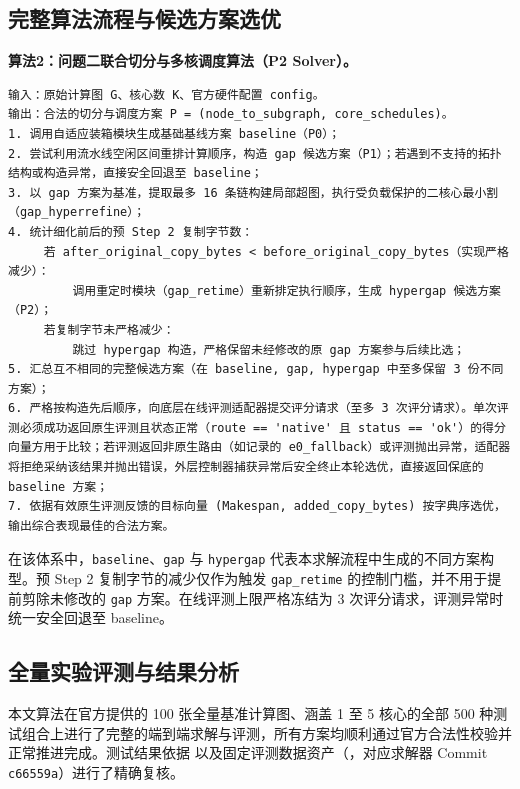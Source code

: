 \documentclass[anonymous,notoc]{gmcm2026}
\begin{document}
\subsection{完整算法流程与候选方案选优}

\textbf{算法2：问题二联合切分与多核调度算法（P2 Solver）。}

\begin{lstlisting}[style=gmcmappendix,language={}]
输入：原始计算图 G、核心数 K、官方硬件配置 config。
输出：合法的切分与调度方案 P = (node_to_subgraph, core_schedules)。
1. 调用自适应装箱模块生成基础基线方案 baseline（P0）；
2. 尝试利用流水线空闲区间重排计算顺序，构造 gap 候选方案（P1）；若遇到不支持的拓扑结构或构造异常，直接安全回退至 baseline；
3. 以 gap 方案为基准，提取最多 16 条链构建局部超图，执行受负载保护的二核心最小割（gap_hyperrefine）；
4. 统计细化前后的预 Step 2 复制字节数：
     若 after_original_copy_bytes < before_original_copy_bytes（实现严格减少）：
         调用重定时模块（gap_retime）重新排定执行顺序，生成 hypergap 候选方案（P2）；
     若复制字节未严格减少：
         跳过 hypergap 构造，严格保留未经修改的原 gap 方案参与后续比选；
5. 汇总互不相同的完整候选方案（在 baseline, gap, hypergap 中至多保留 3 份不同方案）；
6. 严格按构造先后顺序，向底层在线评测适配器提交评分请求（至多 3 次评分请求）。单次评测必须成功返回原生评测且状态正常（route == 'native' 且 status == 'ok'）的得分向量方用于比较；若评测返回非原生路由（如记录的 e0_fallback）或评测抛出异常，适配器将拒绝采纳该结果并抛出错误，外层控制器捕获异常后安全终止本轮选优，直接返回保底的 baseline 方案；
7. 依据有效原生评测反馈的目标向量 (Makespan, added_copy_bytes) 按字典序选优，输出综合表现最佳的合法方案。
\end{lstlisting}

在该体系中，\texttt{baseline}、\texttt{gap} 与 \texttt{hypergap} 代表本求解流程中生成的不同方案构型。预 Step 2 复制字节的减少仅作为触发 \texttt{gap\_retime} 的控制门槛，并不用于提前剪除未修改的 \texttt{gap} 方案。在线评测上限严格冻结为 3 次评分请求，评测异常时统一安全回退至 baseline。

\subsection{全量实验评测与结果分析}

本文算法在官方提供的 100 张全量基准计算图、涵盖 1 至 5 核心的全部 500 种测试组合上进行了完整的端到端求解与评测，所有方案均顺利通过官方合法性校验并正常推进完成。测试结果依据 \texttt{} 以及固定评测数据资产（\texttt{}，对应求解器 Commit \texttt{c66559a}）进行了精确复核。
\end{document}
